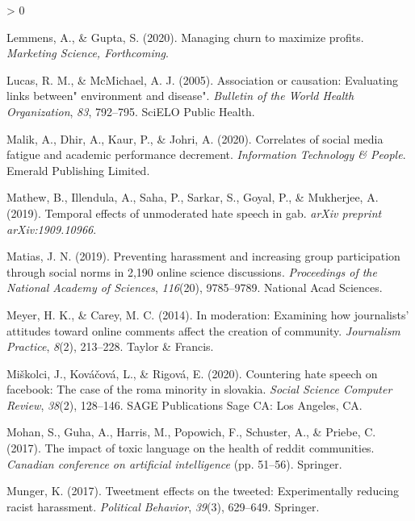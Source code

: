 \documentclass[
  10pt,
  dvipsnames]{scrartcl}
\newlength{\cslhangindent}
\newenvironment{CSLReferences}[2] %
 {%
  \setlength{\parindent}{0pt}
  \ifodd #1 \everypar{\setlength{\hangindent}{\cslhangindent}}\ignorespaces\fi
  \ifnum #2 > 0
  \setlength{\parskip}{#2\baselineskip}
  \fi
 }%
 {}
\begin{document}
\begin{CSLReferences}{1}{0}
\leavevmode\hypertarget{ref-lemmens2020managing}{}%
Lemmens, A., \& Gupta, S. (2020). Managing churn to maximize profits.
\emph{Marketing Science, Forthcoming}.

\leavevmode\hypertarget{ref-lucas2005association}{}%
Lucas, R. M., \& McMichael, A. J. (2005). Association or causation:
Evaluating links between" environment and disease". \emph{Bulletin of
the World Health Organization}, \emph{83}, 792--795. SciELO Public
Health.

\leavevmode\hypertarget{ref-malik2020correlates}{}%
Malik, A., Dhir, A., Kaur, P., \& Johri, A. (2020). Correlates of social
media fatigue and academic performance decrement. \emph{Information
Technology \& People}. Emerald Publishing Limited.

\leavevmode\hypertarget{ref-mathew2019temporal}{}%
Mathew, B., Illendula, A., Saha, P., Sarkar, S., Goyal, P., \&
Mukherjee, A. (2019). Temporal effects of unmoderated hate speech in
gab. \emph{arXiv preprint arXiv:1909.10966}.

\leavevmode\hypertarget{ref-matias2019preventing}{}%
Matias, J. N. (2019). Preventing harassment and increasing group
participation through social norms in 2,190 online science discussions.
\emph{Proceedings of the National Academy of Sciences}, \emph{116}(20),
9785--9789. National Acad Sciences.

\leavevmode\hypertarget{ref-meyer2014moderation}{}%
Meyer, H. K., \& Carey, M. C. (2014). In moderation: Examining how
journalists' attitudes toward online comments affect the creation of
community. \emph{Journalism Practice}, \emph{8}(2), 213--228. Taylor \&
Francis.

\leavevmode\hypertarget{ref-mivskolci2020countering}{}%
Miškolci, J., Kováčová, L., \& Rigová, E. (2020). Countering hate speech
on facebook: The case of the roma minority in slovakia. \emph{Social
Science Computer Review}, \emph{38}(2), 128--146. SAGE Publications Sage
CA: Los Angeles, CA.

\leavevmode\hypertarget{ref-mohan2017impact}{}%
Mohan, S., Guha, A., Harris, M., Popowich, F., Schuster, A., \& Priebe,
C. (2017). The impact of toxic language on the health of reddit
communities. \emph{Canadian conference on artificial intelligence} (pp.
51--56). Springer.

\leavevmode\hypertarget{ref-munger2017tweetment}{}%
Munger, K. (2017). Tweetment effects on the tweeted: Experimentally
reducing racist harassment. \emph{Political Behavior}, \emph{39}(3),
629--649. Springer.


\end{CSLReferences}
\end{document}

